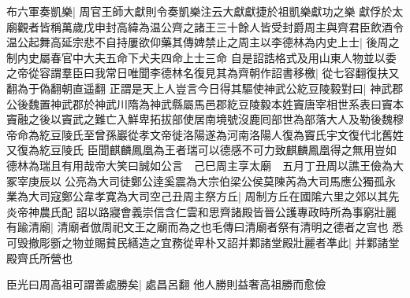 布六軍奏凱樂|{
	周官王師大獻則令奏凱樂注云大獻獻捷於祖凱樂獻功之樂}
獻俘於太廟觀者皆稱萬歲戊申封高緯為温公齊之諸王三十餘人皆受封爵周主與齊君臣飲酒令温公起舞高延宗悲不自持屢欲仰藥其傳婢禁止之周主以李德林為内史上士|{
	後周之制内史屬春官中大夫五命下犬夫四命上士三命}
自是詔誥格式及用山東人物並以委之帝從容謂羣臣曰我常日唯聞李德林名復見其為齊朝作詔書移檄|{
	從七容翻復扶又翻為于偽翻朝直遥翻}
正謂是天上人豈言今日得其驅使神武公紇豆陵毅對曰|{
	神武郡公後魏置神武郡於神武川隋為神武縣屬馬邑郡紇豆陵毅本姓竇唐宰相世系表曰竇本竇融之後以竇武之難亡入鮮卑拓拔部使居南境號沒鹿囘部世為部落大人及勒後魏穆帝命為紇豆陵氏至曾孫巖從孝文帝徙洛陽遂為河南洛陽人復為竇氏宇文復代北舊姓又復為紇豆陵氏}
臣聞麒麟鳳凰為王者瑞可以德感不可力致麒麟鳳凰得之無用豈如德林為瑞且有用哉帝大笑曰誠如公言　己巳周主享太廟　五月丁丑周以譙王儉為大冢宰庚辰以公亮為大司徒鄭公逹奚震為大宗伯梁公侯莫陳芮為大司馬應公獨孤永業為大司寇鄭公韋孝寛為大司空己丑周主祭方丘|{
	周制方丘在國隂六里之郊以其先炎帝神農氏配}
詔以路寢會義崇信含仁雲和思齊諸殿皆晉公護專政時所為事窮壯麗有踰清廟|{
	清廟者倣周祀文王之廟而為之也毛傳曰清廟者祭有清明之德者之宫也}
悉可毁撤彫斵之物並賜貧民繕造之宜務從卑朴又詔并鄴諸堂殿壯麗者凖此|{
	并鄴諸堂殿齊氏所營也}


臣光曰周高祖可謂善處勝矣|{
	處昌呂翻}
他人勝則益奢高祖勝而愈儉

